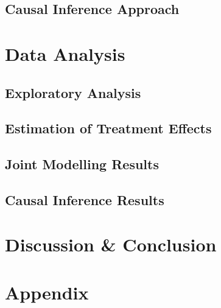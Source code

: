 \documentclass[a4paper]{article}\usepackage[]{graphicx}\usepackage[]{color}
\begin{document}
\subsection{Causal Inference Approach}

\section{Data Analysis}
\subsection{Exploratory Analysis}

\subsection{Estimation of Treatment Effects}

\subsection{Joint Modelling Results}

\subsection{Causal Inference Results}

\section{Discussion \& Conclusion}



%
\printbibliography

\section*{Appendix}
\end{document}
